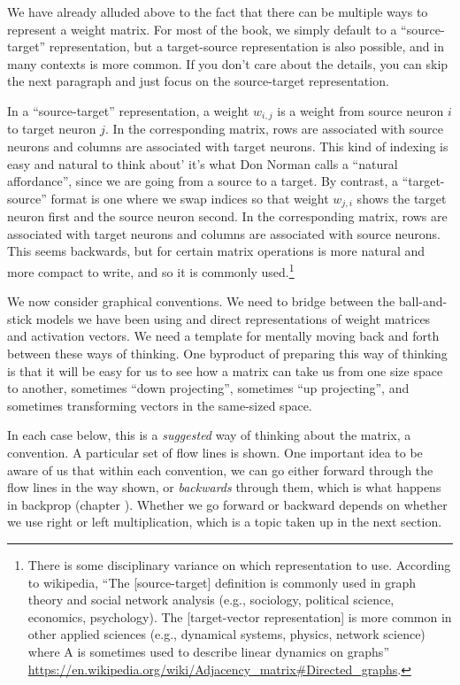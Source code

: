 We have already alluded above to the fact that there can be multiple ways to represent a weight matrix. For most of the book, we simply default to a ``source-target'' representation, but a target-source representation is also possible, and in many contexts is more common. If you don't care about the details, you can skip the next paragraph and just focus on the source-target representation.

In a ``source-target'' representation, a weight $w_{i, j}$ is a weight from source neuron $i$ to target neuron $j$. In the corresponding matrix, rows are associated with source neurons and columns are associated with target neurons. This kind of indexing is easy and natural to think about' it's what Don Norman calls a ``natural affordance'', since we are going from a source to a target.  By contrast,  a ``target-source'' format is one where we swap indices so that weight $w_{j, i}$ shows the target neuron first and the source neuron second.  In the corresponding matrix, rows are associated with target neurons and columns are associated with source neurons. This seems backwards, but for certain matrix operations is more natural and more compact to write, and so it is commonly used.\footnote{There is some disciplinary variance on which representation to use. According to wikipedia, ``The [source-target] definition is commonly used in graph theory and social network analysis (e.g., sociology, political science, economics, psychology). The [target-vector representation] is more common in other applied sciences (e.g., dynamical systems, physics, network science) where A is sometimes used to describe linear dynamics on graphs'' \url{https://en.wikipedia.org/wiki/Adjacency_matrix\#Directed_graphs}.}

We now consider graphical conventions. We need to bridge between the ball-and-stick models we have been using and direct representations of weight matrices and activation vectors. We need a template for mentally moving back and forth between these ways of thinking. One byproduct of preparing this way of thinking is that it will be easy for us to see how a matrix can take us from one size space to another, sometimes ``down projecting'', sometimes ``up projecting'', and sometimes transforming vectors in the same-sized space.

In each case below, this is a \emph{suggested} way of thinking about the matrix, a convention.  A particular set of flow lines is shown.  One important idea to be aware of us that within each convention, we can go either forward through the flow lines in the way shown, or \emph{backwards} through them, which is what happens in backprop (chapter ).  Whether we go forward or backward depends on whether we use right or left multiplication, which is a topic taken up in the next section.

